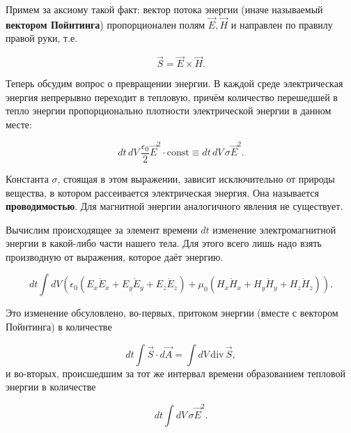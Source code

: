 \documentclass[11pt,a4paper]{article}
\numberwithin{equation}{section}
\renewcommand{\div}{\mathrm{div}\,}
\newcommand{\eps}{\epsilon}
\newcommand{\const}{\mathrm{const}}
\begin{document}
Примем за аксиому такой факт: вектор потока энергии (иначе называемый
\textbf{вектором Пойнтинга}) пропорционален полям $\vec{E}, \vec{H}$ и
направлен по правилу правой руки, т.е.

\begin{equation}
  \label{eq:def_pointing}
  \vec{S} = \vec{E} \times \vec{H}.
\end{equation}


Теперь обсудим вопрос о превращении энергии. В каждой среде
электрическая энергия непрерывно переходит в тепловую, причём
количество перешедшей в тепло энергии пропорционально плотности
электрической энергии в данном месте:

\begin{equation}
  \label{eq:def_heat_from_electric}
  dt\, dV\, \frac{\eps_0}{2} \vec{E}^2 \cdot \const \equiv dt\, dV\,
  \sigma \vec{E}^2.
\end{equation}

Константа $\sigma$, стоящая в этом выражении, зависит исключительно от
природы вещества, в котором рассеивается электрическая энергия. Она
называется \textbf{проводимостью}. Для магнитной энергии аналогичного
явления не существует.

Вычислим происходящее за элемент времени $dt$ изменение
электромагнитной энергии в какой-либо части нашего тела. Для этого
всего лишь надо взять производную от выражения, которое даёт энергию. 

\begin{equation}
  \label{eq:conserv_energy_der_1}
  dt \int dV \left( \eps_0 (E_x \dot{E}_x + E_y \dot{E}_y +
    E_z \dot{E}_z) + \mu_0 (H_x \dot{H}_x + H_y \dot{H}_y +
    H_z \dot{H}_z) \right).
\end{equation}

Это изменение обсуловлено, во-первых, притоком энергии (вместе с
вектором Пойнтинга) в количестве

\begin{equation}
  \label{eq:conserv_energy_der_2}
  dt \int \vec{S} \cdot d\vec{A} =  \int dV\, \div \vec{S} ,
\end{equation}
и во-вторых, происшедшим за тот же интервал времени образованием
тепловой энергии в количестве 

\begin{equation}
  \label{eq:conserv_energy_der_3}
  dt \int dV\, \sigma \vec{E}^2.
\end{equation}
\end{document}
